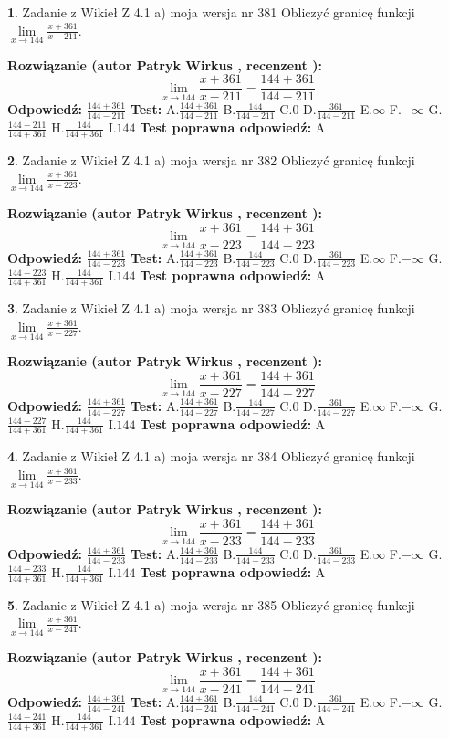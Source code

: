 \documentclass[12pt, a4paper]{article}
\theoremstyle{definition} %
\newtheorem{zad}{}
\newcommand{\zadStart}[1]{\begin{zad}#1\newline}
\newcommand{\zadStop}{\end{zad}}
\newcommand{\rozwStart}[2]{\noindent \textbf{Rozwiązanie (autor #1 , recenzent #2): }\newline}
\newcommand{\rozwStop}{\newline}
\newcommand{\odpStart}{\noindent \textbf{Odpowiedź:}\newline}
\newcommand{\odpStop}{\newline}
\newcommand{\testStart}{\noindent \textbf{Test:}\newline}
\newcommand{\testStop}{\newline}
\newcommand{\kluczStart}{\noindent \textbf{Test poprawna odpowiedź:}\newline}
\newcommand{\kluczStop}{\newline}
\begin{document}
\zadStart{Zadanie z Wikieł Z 4.1 a) moja wersja nr 381}
Obliczyć granicę funkcji $\lim\limits_{x\to144}\frac{x+361}{x-211}$.
\zadStop
\rozwStart{Patryk Wirkus}{}
$$\lim\limits_{x\to144}\frac{x+361}{x-211} = \frac{144+361}{144-211}$$
\rozwStop
\odpStart
$\frac{144+361}{144-211}$
\odpStop
\testStart
A.$\frac{144+361}{144-211}$
B.$\frac{144}{144-211}$
C.$0$
D.$\frac{361}{144-211}$
E.$\infty$
F.$-\infty$
G.$\frac{144-211}{144+361}$
H.$\frac{144}{144+361}$
I.$144$
\testStop
\kluczStart
A
\kluczStop



\zadStart{Zadanie z Wikieł Z 4.1 a) moja wersja nr 382}
Obliczyć granicę funkcji $\lim\limits_{x\to144}\frac{x+361}{x-223}$.
\zadStop
\rozwStart{Patryk Wirkus}{}
$$\lim\limits_{x\to144}\frac{x+361}{x-223} = \frac{144+361}{144-223}$$
\rozwStop
\odpStart
$\frac{144+361}{144-223}$
\odpStop
\testStart
A.$\frac{144+361}{144-223}$
B.$\frac{144}{144-223}$
C.$0$
D.$\frac{361}{144-223}$
E.$\infty$
F.$-\infty$
G.$\frac{144-223}{144+361}$
H.$\frac{144}{144+361}$
I.$144$
\testStop
\kluczStart
A
\kluczStop



\zadStart{Zadanie z Wikieł Z 4.1 a) moja wersja nr 383}
Obliczyć granicę funkcji $\lim\limits_{x\to144}\frac{x+361}{x-227}$.
\zadStop
\rozwStart{Patryk Wirkus}{}
$$\lim\limits_{x\to144}\frac{x+361}{x-227} = \frac{144+361}{144-227}$$
\rozwStop
\odpStart
$\frac{144+361}{144-227}$
\odpStop
\testStart
A.$\frac{144+361}{144-227}$
B.$\frac{144}{144-227}$
C.$0$
D.$\frac{361}{144-227}$
E.$\infty$
F.$-\infty$
G.$\frac{144-227}{144+361}$
H.$\frac{144}{144+361}$
I.$144$
\testStop
\kluczStart
A
\kluczStop



\zadStart{Zadanie z Wikieł Z 4.1 a) moja wersja nr 384}
Obliczyć granicę funkcji $\lim\limits_{x\to144}\frac{x+361}{x-233}$.
\zadStop
\rozwStart{Patryk Wirkus}{}
$$\lim\limits_{x\to144}\frac{x+361}{x-233} = \frac{144+361}{144-233}$$
\rozwStop
\odpStart
$\frac{144+361}{144-233}$
\odpStop
\testStart
A.$\frac{144+361}{144-233}$
B.$\frac{144}{144-233}$
C.$0$
D.$\frac{361}{144-233}$
E.$\infty$
F.$-\infty$
G.$\frac{144-233}{144+361}$
H.$\frac{144}{144+361}$
I.$144$
\testStop
\kluczStart
A
\kluczStop



\zadStart{Zadanie z Wikieł Z 4.1 a) moja wersja nr 385}
Obliczyć granicę funkcji $\lim\limits_{x\to144}\frac{x+361}{x-241}$.
\zadStop
\rozwStart{Patryk Wirkus}{}
$$\lim\limits_{x\to144}\frac{x+361}{x-241} = \frac{144+361}{144-241}$$
\rozwStop
\odpStart
$\frac{144+361}{144-241}$
\odpStop
\testStart
A.$\frac{144+361}{144-241}$
B.$\frac{144}{144-241}$
C.$0$
D.$\frac{361}{144-241}$
E.$\infty$
F.$-\infty$
G.$\frac{144-241}{144+361}$
H.$\frac{144}{144+361}$
I.$144$
\testStop
\kluczStart
A
\kluczStop
\end{document}
